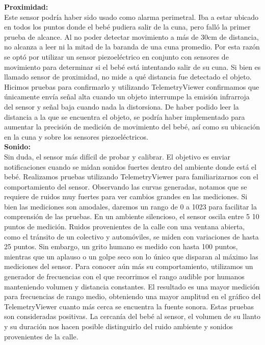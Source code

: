 \documentclass{IEEEtran}
\begin{document}
\textbf{Proximidad:}\\
Este sensor podría haber sido usado como alarma perimetral. Iba a estar ubicado en todos los puntos donde el bebé pudiera salir de la cuna, pero falló la primer prueba de alcance. Al no poder detectar movimiento a más de 30cm de distancia, no alcanza a leer ni la mitad de la baranda de una cuna promedio. 
Por esta razón se optó por utilizar un sensor piezoeléctrico en conjunto con sensores de movimiento para determinar si el bebé está intentando salir de su cuna. Si bien es llamado sensor de proximidad, no mide a qué distancia fue detectado el objeto. Hicimos pruebas para confirmarlo y utilizando TelemetryViewer confirmamos que únicamente envía señal alta cuando un objeto interrumpe la emisión infrarroja del sensor y señal baja cuando nada la distorsiona. De haber podido leer la distancia a la que se encuentra el objeto, se podría haber implementado para aumentar la precisión de medición de movimiento del bebé, así como su ubicación en la cuna y sobre los sensores piezoeléctricos.\\

\textbf{Sonido:}\\
Sin duda, el sensor más difícil de probar y calibrar. El objetivo es enviar notificaciones cuando se midan sonidos fuertes dentro del ambiente donde está el bebé.
Realizamos pruebas utilizando TelemetryViewer para familiarizarnos con el comportamiento del sensor. Observando las curvas generadas, notamos que se requiere de ruidos muy fuertes para ver cambios grandes en las mediciones. Si bien las mediciones son amodales, daremos un rango de 0 a 1023 para facilitar la comprensión de las pruebas. 
En un ambiente silencioso, el sensor oscila entre 5 10 puntos de medición. Ruidos provenientes de la calle con una ventana abierta, como el tránsito de un colectivo y automóviles, se miden con variaciones de hasta 25 puntos. Sin embargo, un grito humano es medido con hasta 100 puntos, mientras que un aplauso o un golpe seco son lo único que disparan al máximo las mediciones del sensor.
Para conocer aún más su comportamiento, utilizamos un generador de frecuencias con el que recorrimos el rango audible por humanos manteniendo volumen y distancia constantes. El resultado es una mayor medición para frecuencias de rango medio, obteniendo una mayor amplitud en el gráfico del TelemetryViewer cuanto más cerca se encuentra la fuente sonora. 
Estas pruebas son consideradas positivas. La cercanía del bebé al sensor, el volumen de su llanto y su duración nos hacen posible distinguirlo del ruido ambiente y sonidos provenientes de la calle.\newline
\end{document}
